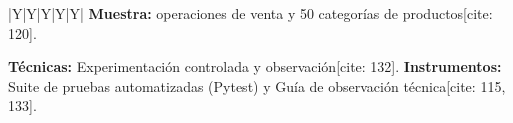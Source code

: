 \begin{landscape}
\begin{tabularx}{\linewidth}{|Y|Y|Y|Y|Y|}
\textbf{Muestra:}  operaciones de venta y 50 categorías de productos[cite: 120]. \newline

\textbf{Técnicas:} Experimentación controlada y observación[cite: 132]. \newline
\textbf{Instrumentos:} Suite de pruebas automatizadas (Pytest) y Guía de observación técnica[cite: 115, 133]. \\ \hline
\end{tabularx}
\end{landscape}